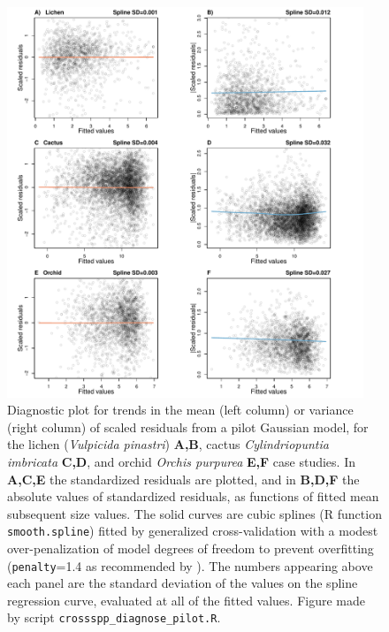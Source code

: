 \documentclass[12pt]{article}
\begin{document}
\begin{spacing}{1.9}
\begin{figure}[tbp]
	\centering
	\includegraphics[width=0.95\textwidth]{figures/cactus_k=6.pdf}
	\caption{Diagnostic plot for trends in the mean (left column) or variance (right column) of scaled residuals from a pilot Gaussian model, for the lichen (\emph{Vulpicida pinastri}) \textbf{A,B}, cactus \emph{Cylindriopuntia imbricata} \textbf{C,D}, and orchid \emph{Orchis purpurea} \textbf{E,F} case studies. 
		In \textbf{A,C,E} the standardized residuals are plotted, and in \textbf{B,D,F} the absolute values of
		standardized residuals, as functions of fitted mean subsequent size values. The solid curves are cubic splines (R function \texttt{smooth.spline}) fitted by generalized cross-validation with a modest over-penalization of model degrees of freedom to prevent overfitting (\texttt{penalty}=1.4 as recommended by \citet{gu-2013}). The numbers appearing above each panel are the standard deviation of the values on the spline regression curve, evaluated at all of the 
		fitted values. Figure made by script \texttt{crossspp\_diagnose\_pilot.R}.}
	\label{fig:diagnose_pilot}
\end{figure}


\end{spacing}
\end{document}
